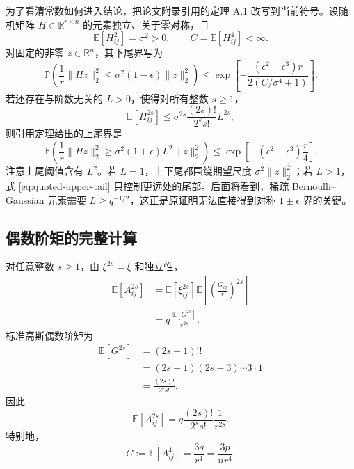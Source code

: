 \documentclass[11pt]{article}
\numberwithin{equation}{section}
\newcommand{\R}{\mathbb{R}}
\newcommand{\E}{\mathbb{E}}
\newcommand{\Pp}{\mathbb{P}}
\newcommand{\1}{\mathbf{1}}
\begin{document}
为了看清常数如何进入结论，把论文附录引用的定理 A.1 改写到当前符号。设随机矩阵 $H\in\R^{r\times n}$ 的元素独立、关于零对称，且
\begin{equation}
  \E[H_{ij}^2]=\sigma^2>0,
  \qquad
  C=\E[H_{ij}^4]<\infty.
\end{equation}
对固定的非零 $z\in\R^n$，其下尾界写为
\begin{equation}
  \Pp\left(
  \frac1r\|Hz\|_2^2
  \le\sigma^2(1-\epsilon)\|z\|_2^2
  \right)
  \le
  \exp\!\left[
  -\frac{(\epsilon^2-\epsilon^3)r}
  {2(C/\sigma^4+1)}
  \right].
  \label{eq:quoted-lower-tail}
\end{equation}
若还存在与阶数无关的 $L>0$，使得对所有整数 $s\ge1$，
\begin{equation}
  \E[H_{ij}^{2s}]
  \le\sigma^{2s}\frac{(2s)!}{2^ss!}L^{2s},
  \label{eq:quoted-moment-condition}
\end{equation}
则引用定理给出的上尾界是
\begin{equation}
  \Pp\left(
  \frac1r\|Hz\|_2^2
  \ge\sigma^2(1+\epsilon)L^2\|z\|_2^2
  \right)
  \le
  \exp\!\left[-(\epsilon^2-\epsilon^3)\frac r4\right].
  \label{eq:quoted-upper-tail}
\end{equation}
注意上尾阈值含有 $L^2$。若 $L=1$，上下尾都围绕期望尺度 $\sigma^2\|z\|_2^2$；若 $L>1$，式 \eqref{eq:quoted-upper-tail} 只控制更远处的尾部。后面将看到，稀疏 Bernoulli--Gaussian 元素需要 $L\ge q^{-1/2}$，这正是原证明无法直接得到对称 $1\pm\epsilon$ 界的关键。

\subsection{偶数阶矩的完整计算}

对任意整数 $s\ge1$，由 $\xi^{2s}=\xi$ 和独立性，
\begin{align}
  \E[A_{ij}^{2s}]
  &=\E\left[\xi_{ij}^{2s}\right]
    \E\left[\left(\frac{G_{ij}}r\right)^{2s}\right]\\
  &=q\,\frac{\E[G^{2s}]}{r^{2s}}.
  \label{eq:moment-step1}
\end{align}
标准高斯偶数阶矩为
\begin{align}
  \E[G^{2s}]
  &=(2s-1)!!\\
  &=(2s-1)(2s-3)\cdots3\cdot1\\
  &=\frac{(2s)!}{2^s s!}.
\end{align}
因此
\begin{equation}
  \boxed{
  \E[A_{ij}^{2s}]
  =q\frac{(2s)!}{2^s s!}\frac1{r^{2s}}.}
  \label{eq:correct-even-moment}
\end{equation}
特别地，
\begin{equation}
  C:=\E[A_{ij}^4]
  =\frac{3q}{r^4}
  =\frac{3p}{nr^4}.
  \label{eq:fourth-moment}
\end{equation}
\end{document}

